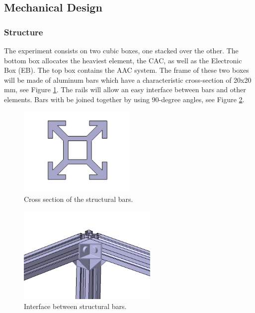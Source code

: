 \pagebreak
\subsection{Mechanical Design} \label{Mechanical_Design}


\subsubsection{Structure}

The experiment consists on two cubic boxes, one stacked over the other. The bottom box allocates the heaviest element, the CAC, as well as the Electronic Box (EB). The top box contains the AAC system. The frame of these two boxes will be made of aluminum bars which have a characteristic cross-section of 20x20 mm, see Figure \ref{cross-section}. The rails will allow an easy interface between bars and other elements. Bars with be joined together by using 90-degree angles, see Figure \ref{3_bars_joined}.


\begin{figure}[!ht]
    \centering
    \includegraphics[width=0.5\textwidth]{4-experiment-design/img/1_cross_section.jpg}
    \caption{Cross section of the structural bars.}
    \label{cross-section}
\end{figure}


\begin{figure}[!ht]
    \centering
    \includegraphics[width=0.6\textwidth]{4-experiment-design/img/bars_joint.jpg}
    \caption{Interface between structural bars.}
    \label{3_bars_joined}
\end{figure}


